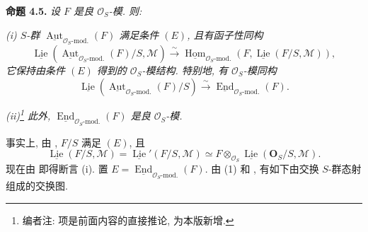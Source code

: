 
\setcounter{footnote}{70}

\medskip
\noindent{}\textbf{命题 4.5.}
\textit{设 \(F\) 是良 \(\mathcal O_S\)-模. 则:}

\textit{(i) \(S\)-群
\(\underline{\operatorname{Aut}}_{\mathcal O_S\text{-mod.}}(F)\)
满足条件 \((E)\), 且有函子性同构}
\[
 \underline{\operatorname{Lie}}\!
   \left(\underline{\operatorname{Aut}}_{\mathcal O_S\text{-mod.}}(F)/S,
         \mathcal M\right)
 \xrightarrow{\sim}
 \underline{\operatorname{Hom}}_{\mathcal O_S\text{-mod.}}
   \left(F,\underline{\operatorname{Lie}}(F/S,\mathcal M)\right),
\]
\textit{它保持由条件 \((E)\) 得到的 \(\mathcal O_S\)-模结构.
特别地, 有 \(\mathcal O_S\)-模同构}
\[
 \underline{\operatorname{Lie}}\!
   \left(\underline{\operatorname{Aut}}_{\mathcal O_S\text{-mod.}}(F)/S\right)
 \xrightarrow{\sim}
 \underline{\operatorname{End}}_{\mathcal O_S\text{-mod.}}(F).
\]

\textit{(ii)\footnote{编者注:
 项是前面内容的直接推论,
为本版新增.} 此外,
\(\underline{\operatorname{End}}_{\mathcal O_S\text{-mod.}}(F)\)
是良 \(\mathcal O_S\)-模.}

事实上, 由 , \(F/S\) 满足 \((E)\), 且
\begin{equation*}
 \underline{\operatorname{Lie}}(F/S,\mathcal M)
 =\underline{\operatorname{Lie}}'(F/S,\mathcal M)
 \simeq
 F\otimes_{\mathcal O_S}
 \underline{\operatorname{Lie}}(\mathbf O_S/S,\mathcal M).
 \tag{1}\label{sga3:ii:proposition:4-5:equation:1}
\end{equation*}
现在由  即得断言 (i). 置
\(E=\underline{\operatorname{End}}_{\mathcal O_S\text{-mod.}}(F)\).
由 (1) 和 ,
有如下由交换 \(S\)-群态射组成的交换图.


